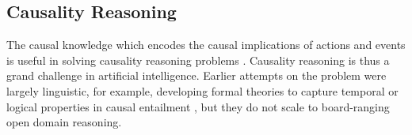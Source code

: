 %
%
%
\subsection{Causality Reasoning}
The causal knowledge which encodes the causal implications of
actions and events is useful in solving causality reasoning problems
\cite{morganstern-commonsense}. 
Causality reasoning is thus a
grand challenge in artificial intelligence. Earlier attempts on the
problem were largely linguistic, for example, developing formal
theories to capture temporal or logical properties in causal
entailment \cite{LascaridesAO92,lascarides:asher:1993a}, but
they do not scale to board-ranging open domain reasoning. 

